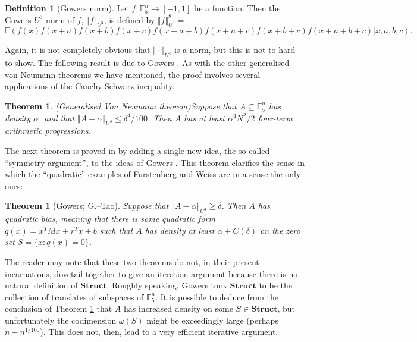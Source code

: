 \documentclass[12pt,a4paper,reqno]{amsart}
\numberwithin{equation}{section}
\theoremstyle{plain}
\newtheorem{theorem}[subsection]{Theorem}
\theoremstyle{definition}
\newtheorem{definition}[subsection]{Definition}
\renewcommand{\leq}{\leqslant}
\renewcommand{\geq}{\geqslant}
\begin{document}
\begin{definition}[Gowers norm]
Let $f : \mathbb{F}_5^n \rightarrow [-1,1]$ be a function. Then the Gowers $U^3$-norm of $f$, $\Vert f \Vert_{U^3}$, is defined by $\Vert f \Vert_{U^3}^8 = $
\begin{equation}\label{gowu3}  \mathbb{E}(f(x)f(x+a)f(x+b)f(x+c)f(x+a+b)f(x+a+c)f(x+b+c)f(x+a+b+c)|x,a,b,c).\end{equation}
\end{definition}
\noindent Again, it is not completely obvious that $\Vert \cdot \Vert_{U^3}$ is a norm, but this is not to hard to show. The following result is due to Gowers \cite{gowers-szem4}. As with the other generalised von Neumann theorems we have mentioned, the proof involves several applications of the Cauchy-Schwarz inequality.

\begin{theorem}(Generalised Von Neumann theorem)\label{gow-thm}
Suppose that $A \subseteq \mathbb{F}_5^n$ has density $\alpha$, and that $\Vert A - \alpha \Vert_{U^3} \leq \delta^4/100$. Then $A$ has at least $\alpha^4 N^2/2$ four-term arithmetic progressions.
\end{theorem}

\noindent The next theorem is proved in \cite{green-tao-ap4s} by adding a single new idea, the so-called ``symmetry argument'', to the ideas of Gowers \cite{gowers-szem4}. This theorem clarifies the sense in which the ``quadratic'' examples of Furstenberg and Weiss are in a sense the only ones:

\begin{theorem}[Gowers; G.--Tao]\label{gow-thm2} Suppose that $\Vert A - \alpha \Vert_{U^3} \geq \delta$. Then $A$ has quadratic bias, meaning that there is some quadratic form $q(x) = x^T M x + r^T x + b$ such that $A$ has density at least $\alpha +  C(\delta)$ on the zero set $S = \{x : q(x) = 0\}$.
\end{theorem}

\noindent The reader may note that these two theorems do not, in their present incarnations, dovetail together to give an iteration argument because there is no natural definition of $\mathbf{Struct}$. Roughly speaking, Gowers took $\mathbf{Struct}$ to be the collection of translates of subspaces of $\mathbb{F}_5^n$. It is possible to deduce from the conclusion of Theorem \ref{gow-thm2} that $A$ has increased density on some $S \in \mathbf{Struct}$, but unfortunately the codimension $\omega(S)$ might be exceedingly large (perhaps $n - n^{1/100}$). This does not, then, lead to a very efficient iterative argument.\vspace{11pt}
\end{document}
